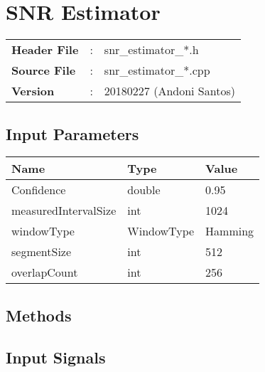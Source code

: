 \clearpage

\section{SNR Estimator}

\begin{refsection}

\begin{tcolorbox}	
	\begin{tabular}{p{2.75cm} p{0.2cm} p{10.5cm}} 	
		\textbf{Header File}   &:& snr\_estimator\_*.h \\
		\textbf{Source File}   &:& snr\_estimator\_*.cpp \\
		\textbf{Version}	   &:& 20180227 (Andoni Santos)
	\end{tabular}
\end{tcolorbox}

\subsection*{Input Parameters}

\begin{table}[H]
	\centering
	\begin{tabular}{|l|l|l|}
		\hline
		\textbf{Name}  		 & \textbf{Type}  & \textbf{Value}    	\\\hline
		Confidence     		 & double         & 0.95              	\\\hline
		measuredIntervalSize & int 			  & 1024				\\\hline
		windowType			 & WindowType     & Hamming			  	\\\hline
		segmentSize			 & int			  & 512					\\\hline
		overlapCount  		 & int			  & 256					\\\hline
	\end{tabular}
\end{table}


\subsection*{Methods}

\subsection*{Input Signals}


\end{refsection}

